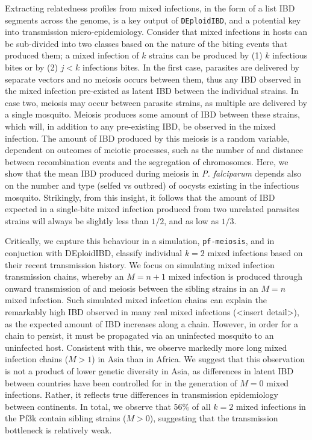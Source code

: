 \documentclass[9pt,lineno]{elife}
\begin{document}
Extracting relatedness profiles from mixed infections, in the form of a list IBD segments across the genome, is a key output of \texttt{DEploidIBD}, and a potential key into transmission micro-epidemiology. Consider that mixed infections in  hosts can be sub-divided into two classes based on the nature of the biting events that produced them; a mixed infection of $k$ strains can be produced by (1) $k$ infectious bites or by (2) $j < k$ infections bites. In the first case, parasites are delivered by separate vectors and no meiosis occurs between them, thus any IBD observed in the mixed infection pre-existed as latent IBD between the individual strains.  In case two, meiosis may occur between parasite strains, as multiple are delivered by a single mosquito.  Meiosis produces some amount of IBD between these strains, which will, in addition to any pre-existing IBD, be observed in the mixed infection.  The amount of IBD produced by this meiosis is a random variable, dependent on outcomes of meiotic processes, such as the number of and distance between recombination events and the segregation of chromosomes.  Here, we show that the mean IBD produced during meiosis in \textit{P. falciparum} depends also on the number and type (selfed vs outbred) of oocysts existing in the infectious mosquito.  Strikingly, from this insight, it follows that the amount of IBD expected in a single-bite mixed infection produced from two unrelated parasites strains will always be slightly less than $1/2$, and as low as $1/3$.

Critically, we capture this behaviour in a simulation, \texttt{pf-meiosis}, and in conjuction with DEploidIBD, classify individual $k=2$ mixed infections based on their recent transmission history.  We focus on simulating mixed infection transmission chains, whereby an $M=n+1$ mixed infection is produced through onward transmission of and meiosis between the sibling strains in an $M=n$ mixed infection.  Such simulated mixed infection chains can explain the remarkably high IBD observed in many real mixed infections (<insert detail>), as the expected amount of IBD increases along a chain. However, in order for a chain to persist, it must be propagated via an uninfected mosquito to an uninfected host. Consistent with this, we observe markedly more long mixed infection chains ($M>1$) in Asia than in Africa. We suggest that this observation is not a product of lower genetic diversity in Asia, as differences in latent IBD between countries have been controlled for in the generation of $M=0$ mixed infections. Rather, it reflects true differences in transmission epidemiology between continents. In total, we observe that 56\% of all $k=2$ mixed infections in the Pf3k contain sibling strains ($M>0$), suggesting that the transmission bottleneck is relatively weak.
\end{document}
